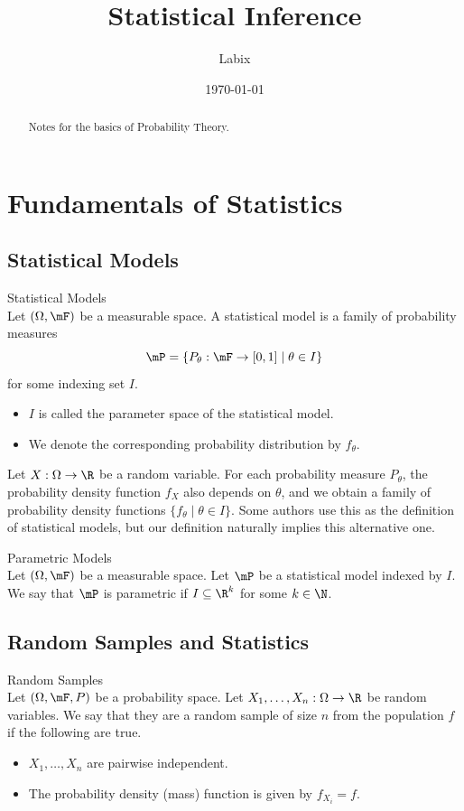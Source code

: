 \documentclass[a4paper]{article}
\title{Statistical Inference}
\author{Labix}
\date{\today}
\begin{document}
\maketitle
\begin{abstract}
Notes for the basics of Probability Theory. 
\end{abstract}
\pagebreak
\tableofcontents
\pagebreak

\section{Fundamentals of Statistics}
\subsection{Statistical Models}
\begin{defn}{Statistical Models}{}\\
Let $(\Omega,\mF)$ be a measurable space. A statistical model is a family of probability measures $$\mP=\{P_\theta:\mF\to[0,1]\;|\;\theta\in I\}$$ for some indexing set $I$. 
\begin{itemize}
\item $I$ is called the parameter space of the statistical model. 
\item We denote the corresponding probability distribution by $f_\theta$. 
\end{itemize}
\end{defn}

Let $X:\Omega\to\R$ be a random variable. For each probability measure $P_\theta$, the probability density function $f_X$ also depends on $\theta$, and we obtain a family of probability density functions $\{f_\theta\;|\;\theta\in I\}$. Some authors use this as the definition of statistical models, but our definition naturally implies this alternative one. 

\begin{defn}{Parametric Models}{}\\
Let $(\Omega,\mF)$ be a measurable space. Let $\mP$ be a statistical model indexed by $I$. We say that $\mP$ is parametric if $I\subseteq\R^k$ for some $k\in\N$. 
\end{defn}

\subsection{Random Samples and Statistics}
\begin{defn}{Random Samples}{}\\
Let $(\Omega,\mF,P)$ be a probability space. Let $X_1,\dots,X_n:\Omega\to\R$ be random variables. We say that they are a random sample of size $n$ from the population $f$ if the following are true. 
\begin{itemize}
\item $X_1,\dots,X_n$ are pairwise independent. 
\item The probability density (mass) function is given by $f_{X_i}=f$. 
\end{itemize}
\end{defn}
\end{document}
